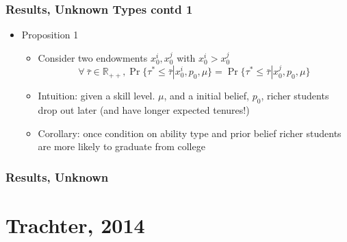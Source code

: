 \begin{frame}
	\frametitle{Results, Unknown Types contd 1}
		\begin{itemize}
			\item Proposition 1
				\begin{itemize}
					\item Consider two endowments $x_{0}^i, x_{0}^j$ with $x_{0}^i > x_{0}^j$
					\begin{equation}
					\forall \ \bar{\tau} \in \mathbb{R}_{++}, \Pr \{ \tau^* \leq \bar{\tau} | x_{0}^i, p_{0}, \mu \} = \Pr \{ \tau^* \leq \bar{\tau} | x_{0}^j, p_{0}, \mu \}
					\end{equation}
					\item Intuition: given a skill level. $\mu$, and a initial belief, $p_{0}$, richer students drop out later (and have longer expected tenures!)
					\item Corollary: once condition on ability type and prior belief richer students are more likely to graduate from college
				\end{itemize}
		\end{itemize}
\end{frame}






\begin{frame}
	\frametitle{Results, Unknown}
\end{frame}

\section{Trachter, 2014}


